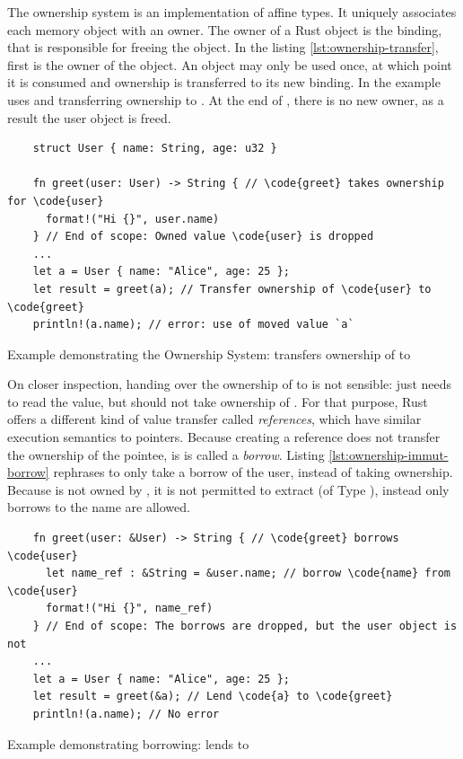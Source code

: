 \documentclass[twoside, english]{sdqthesis}
\theoremstyle{definition}
\begin{document}
The ownership system is an implementation of affine types. It uniquely associates each memory object with an owner. 
The owner of a Rust object is the binding, that is responsible for freeing the object. In the listing \ref{lst:ownership-transfer}, first  is the owner of the  object. An object may only be used once, at which point it is consumed and ownership is transferred to its new binding. In the example  uses  and transferring ownership to . At the end of , there is no new owner, as a result the user object is freed.

\begin{listing}[ht]
  \begin{verbatim}
    struct User { name: String, age: u32 }

    fn greet(user: User) -> String { // \code{greet} takes ownership for \code{user}
      format!("Hi {}", user.name)
    } // End of scope: Owned value \code{user} is dropped
    ...
    let a = User { name: "Alice", age: 25 };
    let result = greet(a); // Transfer ownership of \code{user} to \code{greet}
    println!(a.name); // error: use of moved value `a`
  \end{verbatim}
  \caption{Example demonstrating the Ownership System:  transfers ownership of  to }
  \label{lst:ownership-transfer}
\end{listing}

On closer inspection, handing over the ownership of  to  is not sensible:  just needs to read the value, but should not take ownership of . 
For that purpose, Rust offers a different kind of value transfer called \textit{references}, which have similar execution semantics to pointers. Because creating a reference does not transfer the ownership of the pointee, is is called a \textit{borrow}. Listing \ref{lst:ownership-immut-borrow} rephrases  to only take a borrow of the user, instead of taking ownership. Because  is not owned by , it is not permitted to extract  (of Type ), instead only borrows to the name are allowed. 

\begin{listing}[ht]
  \begin{verbatim}
    fn greet(user: &User) -> String { // \code{greet} borrows \code{user}
      let name_ref : &String = &user.name; // borrow \code{name} from \code{user}
      format!("Hi {}", name_ref)
    } // End of scope: The borrows are dropped, but the user object is not
    ...
    let a = User { name: "Alice", age: 25 };
    let result = greet(&a); // Lend \code{a} to \code{greet}
    println!(a.name); // No error
  \end{verbatim}
  \caption{Example demonstrating borrowing:  lends  to }
  \label{lst:ownership-immut-borrow}
\end{listing}
\end{document}
